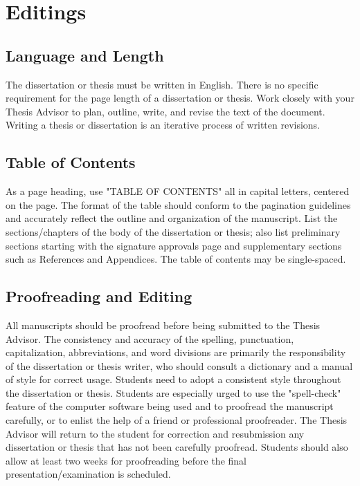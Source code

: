 

\chapter{Editings}
\label{chapter3}

\section{Language and Length}

The dissertation or thesis must be written in English.  There is no specific requirement for the page length of a dissertation or thesis.  Work closely with your Thesis Advisor to plan, outline, write, and revise the text of the document. Writing a thesis or dissertation is an iterative process of written revisions.

\section{Table of Contents}

As a page heading, use "TABLE OF CONTENTS" all in capital letters, centered on the page. The format of the table should conform to the pagination guidelines and accurately reflect the outline and organization of the manuscript. List the sections/chapters of the body of the dissertation or thesis; also list preliminary sections starting with the signature approvals page and supplementary sections such as References and Appendices. The table of contents may be single-spaced.

\section{Proofreading and Editing}

All manuscripts should be proofread before being submitted to the Thesis Advisor. The consistency and accuracy of the spelling, punctuation, capitalization, abbreviations, and word divisions are primarily the responsibility of the dissertation or thesis writer, who should consult a dictionary and a manual of style for correct usage. Students need to adopt a consistent style throughout the dissertation or thesis. Students are especially urged to use the "spell-check" feature of the computer software being used and to proofread the manuscript carefully, or to enlist the help of a friend or professional proofreader. The Thesis Advisor will return to the student for correction and resubmission any dissertation or thesis that has not been carefully proofread. Students should also allow at least two weeks for proofreading before the final presentation/examination is scheduled.

